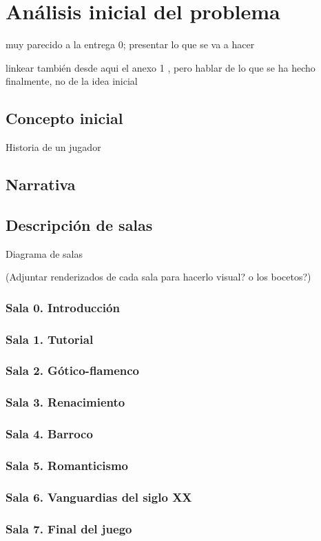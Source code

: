 \chapter{Análisis inicial del problema}
\label{chap:analisis_problema}

muy parecido a la entrega 0; presentar lo que se va a hacer

linkear también desde aqui el anexo 1 , pero hablar de lo que se ha hecho finalmente, no de la idea inicial

\section{Concepto inicial}

Historia de un jugador

\section{Narrativa}

\section{Descripción de salas}

Diagrama de salas

(Adjuntar renderizados de cada sala para hacerlo visual? o los bocetos?)


\subsection{Sala 0. Introducción}

\subsection{Sala 1. Tutorial}

\subsection{Sala 2. Gótico-flamenco}

\subsection{Sala 3. Renacimiento}

\subsection{Sala 4. Barroco}

\subsection{Sala 5. Romanticismo}

\subsection{Sala 6. Vanguardias del siglo XX}

\subsection{Sala 7. Final del juego}


